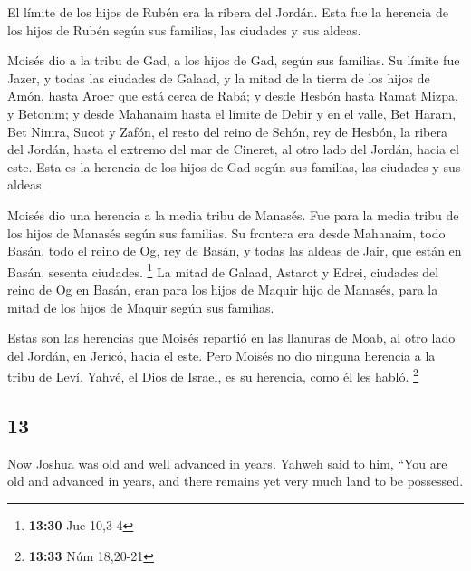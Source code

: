\begin{paracol}{2}
 El límite de los hijos de Rubén era la ribera del
Jordán. Esta fue la herencia de los hijos de Rubén según sus familias,
las ciudades y sus aldeas.

 Moisés dio a la tribu de Gad, a los hijos de Gad, según
sus familias.  Su límite fue Jazer, y todas las ciudades
de Galaad, y la mitad de la tierra de los hijos de Amón, hasta Aroer que
está cerca de Rabá;  y desde Hesbón hasta Ramat Mizpa, y
Betonim; y desde Mahanaim hasta el límite de Debir  y en
el valle, Bet Haram, Bet Nimra, Sucot y Zafón, el resto del reino de
Sehón, rey de Hesbón, la ribera del Jordán, hasta el extremo del mar de
Cineret, al otro lado del Jordán, hacia el este.  Esta es
la herencia de los hijos de Gad según sus familias, las ciudades y sus
aldeas.

 Moisés dio una herencia a la media tribu de Manasés. Fue
para la media tribu de los hijos de Manasés según sus familias.
 Su frontera era desde Mahanaim, todo Basán, todo el
reino de Og, rey de Basán, y todas las aldeas de Jair, que están en
Basán, sesenta ciudades. \footnote{\textbf{13:30} Jue 10,3-4}
 La mitad de Galaad, Astarot y Edrei, ciudades del reino
de Og en Basán, eran para los hijos de Maquir hijo de Manasés, para la
mitad de los hijos de Maquir según sus familias.

 Estas son las herencias que Moisés repartió en las
llanuras de Moab, al otro lado del Jordán, en Jericó, hacia el este.
 Pero Moisés no dio ninguna herencia a la tribu de Leví.
Yahvé, el Dios de Israel, es su herencia, como él les habló. \footnote{\textbf{13:33}
  Núm 18,20-21}

\switchcolumn
\begin{otherlanguage}{english}

\hypertarget{section-25}{%
\section{13}\label{section-25}}

 Now Joshua was old and well advanced in years. Yahweh
said to him, ``You are old and advanced in years, and there remains yet
very much land to be possessed.


\end{otherlanguage}
\end{paracol}
